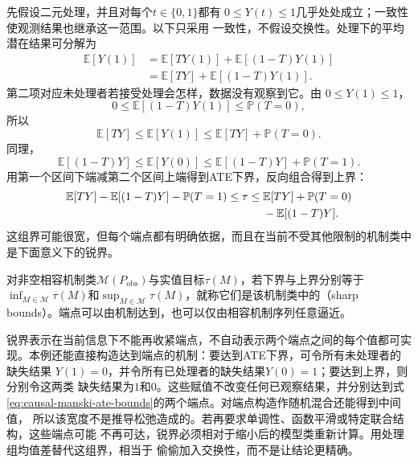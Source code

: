 先假设二元处理，并且对每个\(t\in\{0,1\}\)都有
\(0\leq Y(t)\leq1\)几乎处处成立；一致性使观测结果也继承这一范围。以下只采用
一致性，不假设交换性。处理下的平均潜在结果可分解为
\[
\begin{aligned}
  \mathbb{E}[Y(1)]
  &=
  \mathbb{E}[TY(1)]
  +
  \mathbb{E}[(1-T)Y(1)]\\
  &=
  \mathbb{E}[TY]
  +
  \mathbb{E}[(1-T)Y(1)].
\end{aligned}
\]
第二项对应未处理者若接受处理会怎样，数据没有观察到它。由
\(0\leq Y(1)\leq1\)，
\[
  0
  \leq
  \mathbb{E}[(1-T)Y(1)]
  \leq
  \mathbb{P}(T=0),
\]
所以
\begin{equation}
  \mathbb{E}[TY]
  \leq
  \mathbb{E}[Y(1)]
  \leq
  \mathbb{E}[TY]+\mathbb{P}(T=0).
  \label{eq:causal-bounded-outcome-y1}
\end{equation}
同理，
\begin{equation}
  \mathbb{E}[(1-T)Y]
  \leq
  \mathbb{E}[Y(0)]
  \leq
  \mathbb{E}[(1-T)Y]+\mathbb{P}(T=1).
  \label{eq:causal-bounded-outcome-y0}
\end{equation}
用第一个区间下端减第二个区间上端得到ATE下界，反向组合得到上界：
\begin{align}
  \mathbb{E}[TY]
  -\mathbb{E}[(1-T)Y]
  -\mathbb{P}(T=1)
  \leq \tau
  \leq{}&
  \mathbb{E}[TY]
  +\mathbb{P}(T=0)\notag\\
  &-\mathbb{E}[(1-T)Y].
  \label{eq:causal-manski-ate-bounds}
\end{align}
这组界可能很宽，但每个端点都有明确依据，而且在当前不受其他限制的机制类中是下面意义下的锐界。
\begin{definition}[相容机制类中的锐界]
  \label{def:causal-sharp-bounds}
对非空相容机制类\(\mathcal M(P_{\mathrm{obs}})\)与实值目标\(\tau(M)\)，若下界与上界分别等于\(\inf_{M\in\mathcal M}\tau(M)\)和\(\sup_{M\in\mathcal M}\tau(M)\)，就称它们是该机制类中的（sharp bounds）。端点可以由机制达到，也可以仅由相容机制序列任意逼近。
\end{definition}
锐界表示在当前信息下不能再收紧端点，不自动表示两个端点之间的每个值都可实现。本例还能直接构造达到端点的机制：要达到ATE下界，可令所有未处理者的缺失结果
\(Y(1)=0\)，并令所有已处理者的缺失结果\(Y(0)=1\)；要达到上界，则分别令这两类
缺失结果为\(1\)和\(0\)。这些赋值不改变任何已观察结果，并分别达到式
\eqref{eq:causal-manski-ate-bounds}的两个端点。对端点构造作随机混合还能得到中间值，
所以该宽度不是推导松弛造成的。若再要求单调性、函数平滑或特定联合结构，这些端点可能
不再可达，锐界必须相对于缩小后的模型类重新计算。用处理组均值差替代这组界，相当于
偷偷加入交换性，而不是让结论更精确。


